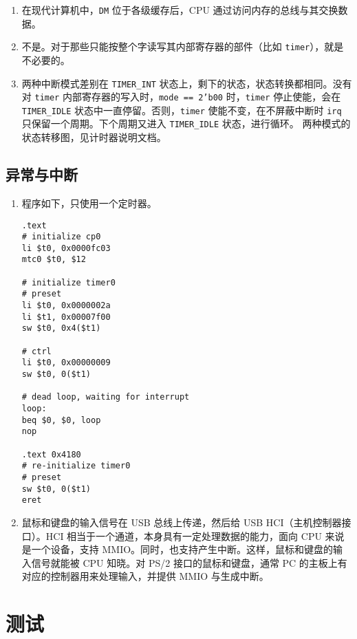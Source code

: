 \documentclass[12pt,AutoFakeBold,AutoFakeSlant]{article}
\providecommand{\tightlist}{%
  \setlength{\itemsep}{0pt}\setlength{\parskip}{0pt}}
\newcommand{\ms}[1]{\texttt{#1}}
\begin{document}
\begin{enumerate}
\tightlist
\item
在现代计算机中，\ms{DM} 位于各级缓存后，CPU 通过访问内存的总线与其交换数据。
\item
不是。对于那些只能按整个字读写其内部寄存器的部件（比如 \ms{timer}），就是不必要的。
\item
两种中断模式差别在 \ms{TIMER\_INT} 状态上，剩下的状态，状态转换都相同。没有对 \ms{timer} 内部寄存器的写入时，\ms{mode == 2'b00} 时，\ms{timer} 停止使能，会在 \ms{TIMER\_IDLE} 状态中一直停留。否则，\ms{timer} 使能不变，在不屏蔽中断时  \ms{irq} 只保留一个周期。下个周期又进入 \ms{TIMER\_IDLE} 状态，进行循环。
两种模式的状态转移图，见计时器说明文档。
\end{enumerate}

\subsection{异常与中断}

\begin{enumerate}
\tightlist
\item
程序如下，只使用一个定时器。
\begin{lstlisting}[language={[mips]Assembler}]
.text
# initialize cp0
li $t0, 0x0000fc03
mtc0 $t0, $12

# initialize timer0
# preset
li $t0, 0x0000002a
li $t1, 0x00007f00
sw $t0, 0x4($t1)

# ctrl
li $t0, 0x00000009
sw $t0, 0($t1)

# dead loop, waiting for interrupt
loop:
beq $0, $0, loop
nop

.text 0x4180
# re-initialize timer0
# preset
sw $t0, 0($t1)
eret
\end{lstlisting}
\item
鼠标和键盘的输入信号在 USB 总线上传递，然后给 USB HCI（主机控制器接口）。HCI 相当于一个通道，本身具有一定处理数据的能力，面向 CPU 来说是一个设备，支持 MMIO。同时，也支持产生中断。这样，鼠标和键盘的输入信号就能被 CPU 知晓。对 PS/2 接口的鼠标和键盘，通常 PC 的主板上有对应的控制器用来处理输入，并提供 MMIO 与生成中断。
\end{enumerate}

\section{测试}
\end{document}
